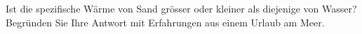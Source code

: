 Ist die spezifische Wärme von Sand grösser oder kleiner als diejenige von Wasser? Begründen Sie Ihre Antwort mit Erfahrungen aus einem Urlaub am Meer.
